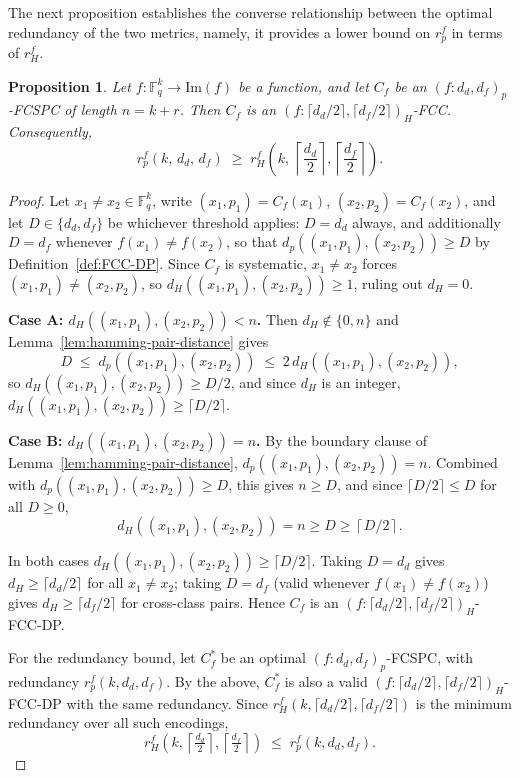 \documentclass[11pt,draftclsnofoot,journal,onecolumn]{IEEEtran}
\newtheorem{proposition}{Proposition}
\begin{document}
    \noindent
    The next proposition establishes the converse relationship between the optimal redundancy of the two metrics, namely, it provides a lower bound on $r_p^f$ in terms of $r_H^f$.
    
    \begin{proposition}
    \label{lem: hamming_symbol_red_low}
    Let $f : \mathbb{F}_q^k \to \mathrm{Im}(f)$ be a function, and let $C_f$ be an $(f : d_d, d_f)_p$-FCSPC of length $n = k+r$. Then $C_f$ is an $(f : \lceil d_d/2 \rceil, \lceil d_f/2 \rceil)_H$-FCC. Consequently,
    \[
    r_p^f(k,\, d_d,\, d_f) \;\geq\; r_H^f\!\left(k,\, \left\lceil \frac{d_d}{2}\right\rceil, \left\lceil\frac{d_f}{2}\right\rceil\right).
    \]
    \end{proposition}

    \begin{proof}
    Let $x_1 \neq x_2 \in \mathbb{F}_q^k$, write $(x_1,p_1)=C_f(x_1)$, $(x_2,p_2)=C_f(x_2)$, and let $D \in \{d_d, d_f\}$ be whichever threshold applies: $D = d_d$ always, and additionally $D = d_f$ whenever $f(x_1)\neq f(x_2)$, so that $d_p((x_1,p_1),(x_2,p_2)) \geq D$ by Definition~\ref{def:FCC-DP}. Since $C_f$ is systematic, $x_1 \neq x_2$ forces $(x_1,p_1)\neq(x_2,p_2)$, so $d_H((x_1,p_1),(x_2,p_2)) \geq 1$, ruling out $d_H=0$.

    \textbf{Case A: $d_H((x_1,p_1),(x_2,p_2)) < n$.} Then $d_H \notin \{0,n\}$ and Lemma~\ref{lem:hamming-pair-distance} gives
    \[
    D \;\leq\; d_p((x_1,p_1),(x_2,p_2)) \;\leq\; 2\,d_H((x_1,p_1),(x_2,p_2)),
    \]
    so $d_H((x_1,p_1),(x_2,p_2)) \geq D/2$, and since $d_H$ is an integer, $d_H((x_1,p_1),(x_2,p_2)) \geq \lceil D/2 \rceil$.

    \textbf{Case B: $d_H((x_1,p_1),(x_2,p_2)) = n$.} By the boundary clause of Lemma~\ref{lem:hamming-pair-distance}, $d_p((x_1,p_1),(x_2,p_2)) = n$. Combined with $d_p((x_1,p_1),(x_2,p_2))\geq D$, this gives $n \geq D$, and since $\lceil D/2\rceil \leq D$ for all $D\geq0$,
    \[
    d_H((x_1,p_1),(x_2,p_2)) = n \geq D \geq \left\lceil D/2 \right\rceil.
    \]

    In both cases $d_H((x_1,p_1),(x_2,p_2)) \geq \lceil D/2\rceil$. Taking $D=d_d$ gives
$d_H \geq \lceil d_d/2\rceil$ for all $x_1\neq x_2$; taking $D=d_f$ (valid whenever
$f(x_1)\neq f(x_2)$) gives $d_H \geq \lceil d_f/2\rceil$ for cross-class pairs. Hence
$C_f$ is an $(f:\lceil d_d/2\rceil, \lceil d_f/2\rceil)_H$-FCC-DP.

For the redundancy bound, let $C_f^*$ be an optimal $(f:d_d,d_f)_p$-FCSPC, with
redundancy $r_p^f(k,d_d,d_f)$. By the above, $C_f^*$ is also a valid
$(f:\lceil d_d/2\rceil,\lceil d_f/2\rceil)_H$-FCC-DP with the same redundancy. Since
$r_H^f(k,\lceil d_d/2\rceil,\lceil d_f/2\rceil)$ is the minimum redundancy over all
such encodings,
\[
r_H^f\!\left(k,\left\lceil\tfrac{d_d}{2}\right\rceil,\left\lceil\tfrac{d_f}{2}\right\rceil\right) \;\leq\; r_p^f(k,d_d,d_f). 
\]
\end{proof}
\end{document}
